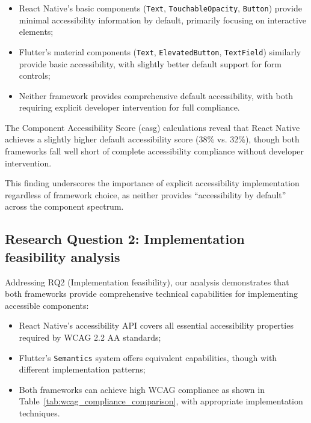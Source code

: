 \begin{itemize}
    \item React Native's basic components (\texttt{Text}, \texttt{TouchableOpacity}, \texttt{Button}) provide minimal accessibility information by default, primarily focusing on interactive elements;
    
    \item Flutter's material components (\texttt{Text}, \texttt{ElevatedButton}, \texttt{TextField}) similarly provide basic accessibility, with slightly better default support for form controls;
    
    \item Neither framework provides comprehensive default accessibility, with both requiring explicit developer intervention for full compliance.
\end{itemize}

The Component Accessibility Score (\gls{casg}) calculations reveal that React Native achieves a slightly higher default accessibility score (38\% vs. 32\%), though both frameworks fall well short of complete accessibility compliance without developer intervention.

This finding underscores the importance of explicit accessibility implementation regardless of framework choice, as neither provides ``accessibility by default'' across the component spectrum.

\subsection{Research Question 2: Implementation feasibility analysis}
\label{subsec:implementation-feasibility}

Addressing RQ2 (Implementation feasibility), our analysis demonstrates that both frameworks provide comprehensive technical capabilities for implementing accessible components:

\begin{itemize}
    \item React Native's accessibility API covers all essential accessibility properties required by WCAG 2.2 AA standards;
    
    \item Flutter's \texttt{Semantics} system offers equivalent capabilities, though with different implementation patterns;
    
    \item Both frameworks can achieve high WCAG compliance as shown in Table~\ref{tab:wcag_compliance_comparison}, with appropriate implementation techniques.
\end{itemize}

